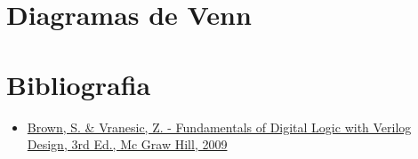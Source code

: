 


\subtitle{Diagramas de Venn} %



\begin{frame}
	\titlepage
\end{frame} 

\section{Diagramas de Venn}





\section{Bibliografia} %

\begin{frame}{\insertsection} 
	\begin{itemize}
		\item \href{https://www.google.com.br/search?q=filetype\%3Apdf+Fundamentals+of+Digital+Logic+with+Verilog+Design+&oq=filetype\%3Apdf}{Brown, S. \& Vranesic, Z. - Fundamentals of Digital Logic with Verilog Design, 3rd Ed., Mc Graw Hill, 2009}
	\end{itemize}
\end{frame}

\begin{frame}
	\titlepage
\end{frame} 

